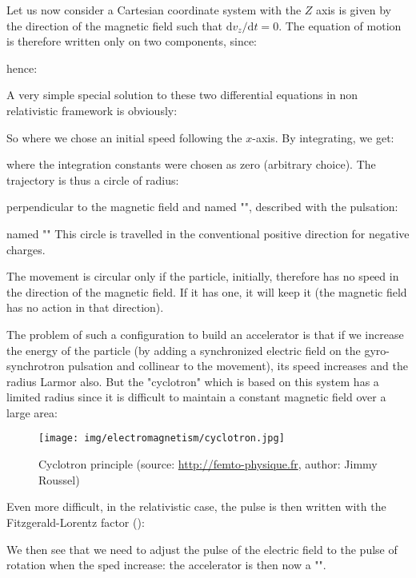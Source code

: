 	Let us now consider a Cartesian coordinate system with the $Z$ axis is given by the direction of the magnetic field such that $\mathrm{d}v_z/\mathrm{d}t=0$. The equation of motion is therefore written only on two components, since:
	
	hence:
	
	A very simple special solution to these two differential equations in non relativistic framework is obviously:
	
	So where we chose an initial speed following the $x$-axis. By integrating, we get:
	
	where the integration constants were chosen as zero (arbitrary choice). The trajectory is thus a circle of radius:
	
	perpendicular to the magnetic field and named "", described with the pulsation:
	
	named "" This circle is travelled in the conventional positive direction for negative charges.
	\begin{tcolorbox}[title=Remark,colframe=black,arc=10pt]
	The movement is circular only if the particle, initially, therefore has no speed in the direction of the magnetic field. If it has one, it will keep it (the magnetic field has no action in that direction).
	\end{tcolorbox}
	The problem of such a configuration to build an accelerator is that if we increase the energy of the particle (by adding a synchronized electric field on the gyro-synchrotron pulsation and collinear to the movement), its speed increases and the radius Larmor also. But the "cyclotron" which is based on this system has a limited radius since it is difficult to maintain a constant magnetic field over a large area:
	\begin{figure}[H]
		\centering
		\texttt{[image: img/electromagnetism/cyclotron.jpg]}
		\caption[Cyclotron principle]{Cyclotron principle (source: \url{http://femto-physique.fr}, author: Jimmy Roussel)}
	\end{figure}

	Even more difficult, in the relativistic case, the pulse is then written with the Fitzgerald-Lorentz factor ():
	
	We then see that we need to adjust the pulse of the electric field to the pulse of rotation when the sped increase: the accelerator is then now a "".
	
